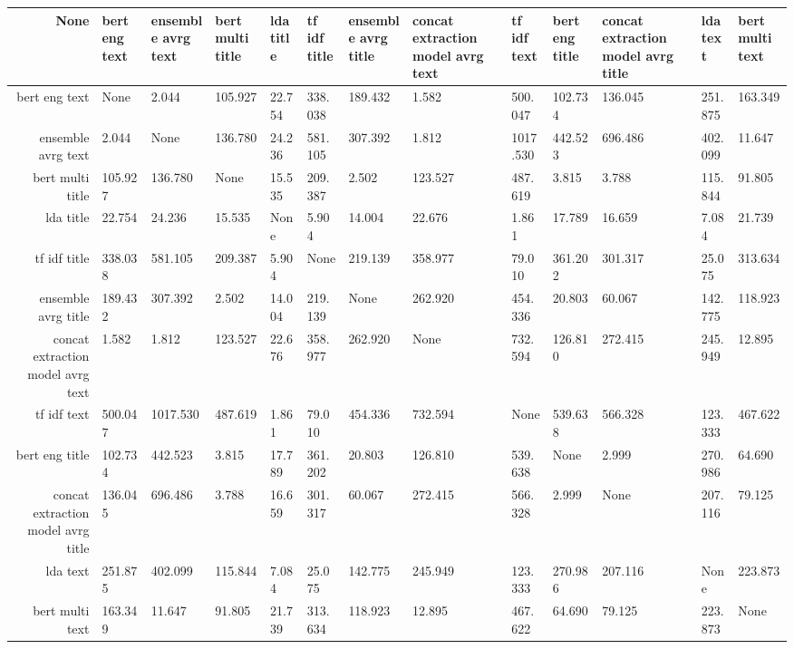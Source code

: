 \begin{tabular}{|r|l|l|l|l|l|l|l|l|l|l|l|l|}
  \hline
  None & bert eng text & ensemble avrg text & bert multi title & lda title & tf idf title & ensemble avrg title & concat extraction model avrg text & tf idf text & bert eng title & concat extraction model avrg title & lda text & bert multi text \\ 
  \hline
  bert eng text & None & 2.044 & 105.927 & 22.754 & 338.038 & 189.432 & 1.582 & 500.047 & 102.734 & 136.045 & 251.875 & 163.349 \\ 
  \hline
  ensemble avrg text & 2.044 & None & 136.780 & 24.236 & 581.105 & 307.392 & 1.812 & 1017.530 & 442.523 & 696.486 & 402.099 & 11.647 \\ 
  \hline
  bert multi title & 105.927 & 136.780 & None & 15.535 & 209.387 & 2.502 & 123.527 & 487.619 & 3.815 & 3.788 & 115.844 & 91.805 \\ 
  \hline
  lda title & 22.754 & 24.236 & 15.535 & None & 5.904 & 14.004 & 22.676 & 1.861 & 17.789 & 16.659 & 7.084 & 21.739 \\ 
  \hline
  tf idf title & 338.038 & 581.105 & 209.387 & 5.904 & None & 219.139 & 358.977 & 79.010 & 361.202 & 301.317 & 25.075 & 313.634 \\ 
  \hline
  ensemble avrg title & 189.432 & 307.392 & 2.502 & 14.004 & 219.139 & None & 262.920 & 454.336 & 20.803 & 60.067 & 142.775 & 118.923 \\ 
  \hline
  concat extraction model avrg text & 1.582 & 1.812 & 123.527 & 22.676 & 358.977 & 262.920 & None & 732.594 & 126.810 & 272.415 & 245.949 & 12.895 \\ 
  \hline
  tf idf text & 500.047 & 1017.530 & 487.619 & 1.861 & 79.010 & 454.336 & 732.594 & None & 539.638 & 566.328 & 123.333 & 467.622 \\ 
  \hline
  bert eng title & 102.734 & 442.523 & 3.815 & 17.789 & 361.202 & 20.803 & 126.810 & 539.638 & None & 2.999 & 270.986 & 64.690 \\ 
  \hline
  concat extraction model avrg title & 136.045 & 696.486 & 3.788 & 16.659 & 301.317 & 60.067 & 272.415 & 566.328 & 2.999 & None & 207.116 & 79.125 \\ 
  \hline
  lda text & 251.875 & 402.099 & 115.844 & 7.084 & 25.075 & 142.775 & 245.949 & 123.333 & 270.986 & 207.116 & None & 223.873 \\ 
  \hline
  bert multi text & 163.349 & 11.647 & 91.805 & 21.739 & 313.634 & 118.923 & 12.895 & 467.622 & 64.690 & 79.125 & 223.873 & None \\ 
  \hline
\end{tabular}
